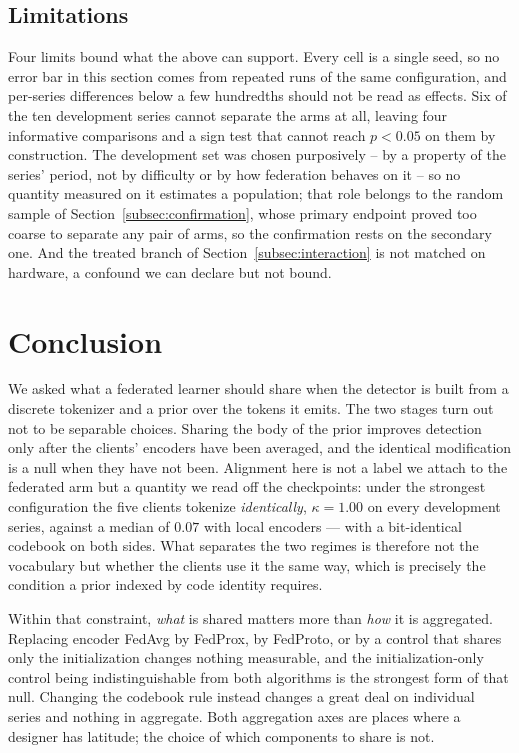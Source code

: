 \documentclass[conference]{IEEEtran}
\begin{document}
\subsection{Limitations}
\label{subsec:limitations}

Four limits bound what the above can support. Every cell is a single seed, so no error bar in
this section comes from repeated runs of the same configuration, and per-series differences
below a few hundredths should not be read as effects. Six of the ten development series cannot
separate the arms at all, leaving four informative comparisons and a sign test that cannot
reach $p<0.05$ on them by construction. The development set was chosen purposively -- by a
property of the series' period, not by difficulty or by how federation behaves on it -- so no
quantity measured on it estimates a population; that role belongs to the random sample of
Section~\ref{subsec:confirmation}, whose primary endpoint proved too coarse to separate any pair of
arms, so the confirmation rests on the secondary one. And the treated branch of
Section~\ref{subsec:interaction} is not matched on hardware, a confound we can declare but not
bound.

\section{Conclusion}
\label{sec:conclusion}

We asked what a federated learner should share when the detector is built from a discrete
tokenizer and a prior over the tokens it emits. The two stages turn out not to be separable
choices. Sharing the body of the prior improves detection only after the clients' encoders have
been averaged, and the identical modification is a null when they have not been. Alignment here is
not a label we attach to the federated arm but a quantity we read off the checkpoints: under the
strongest configuration the five clients tokenize \emph{identically}, $\kappa=1.00$ on every
development series, against a median of $0.07$ with local encoders --- with a bit-identical
codebook on both sides. What separates the two regimes is therefore not the vocabulary but whether
the clients use it the same way, which is precisely the condition a prior indexed by code identity
requires.

Within that constraint, \emph{what} is shared matters more than \emph{how} it is aggregated.
Replacing encoder FedAvg by FedProx, by FedProto, or by a control that shares only the
initialization changes nothing measurable, and the initialization-only control being
indistinguishable from both algorithms is the strongest form of that null. Changing the codebook
rule instead changes a great deal on individual series and nothing in aggregate. Both aggregation
axes are places where a designer has latitude; the choice of which components to share is not.
\end{document}
